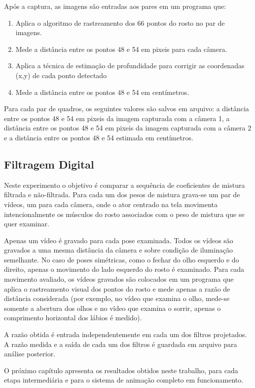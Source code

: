 Após a captura, as imagens são entradas aos pares em um programa que:

\begin{enumerate}

\item Aplica o algoritmo de rastreamento dos 66 pontos do rosto no par de
  imagens.

\item Mede a distância entre os pontos 48 e 54 em pixeis para cada câmera.

\item Aplica a técnica de estimação de profundidade para corrigir as coordenadas
  (x,y) de cada ponto detectado

\item Mede a distância entre os pontos 48 e 54 em centímetros.

\end{enumerate}

Para cada par de quadros, os seguintes valores são salvos em arquivo: a
distância entre os pontos 48 e 54 em pixeis da imagem capturada com a câmera 1,
a distância entre os pontos 48 e 54 em pixeis da imagem capturada com a câmera 2
e a distância entre os pontos 48 e 54 estimada em centímetros. 


\subsection{Filtragem Digital}

Neste experimento o objetivo é comparar a sequência de coeficientes de mistura
filtrada e não-filtrada.  Para cada um dos pesos de mistura grava-se um par de
vídeos, um para cada câmera, onde o ator centrado na tela movimenta
intencionalmente os músculos do rosto associados com o peso de mistura que se
quer examinar. 

Apenas um vídeo é gravado para cada pose examinada. Todos os vídeos são gravados
a uma mesma distância da câmera e sobre condição de iluminação semelhante. No
caso de poses simétricas, como o fechar do olho esquerdo e do direito, apenas o
movimento do lado esquerdo do rosto é examinado. Para cada movimento avaliado,
os vídeos gravados são colocados em um programa que aplica o rastreamento visual
dos pontos do rosto e mede apenas a razão de distância considerada (por exemplo,
no vídeo que examina o olho, mede-se somente a abertura dos olhos e no vídeo que
examina o sorrir, apenas o comprimento horizontal dos lábios é medido). 

A razão obtida é entrada independentemente em cada um dos filtros projetados. A
razão medida e a saída de cada um dos filtros é guardada em arquivo para análise
posterior.

O próximo capítulo apresenta os resultados obtidos neste trabalho, para cada etapa 
intermediária e para o sistema de animação completo em funcionamento.


